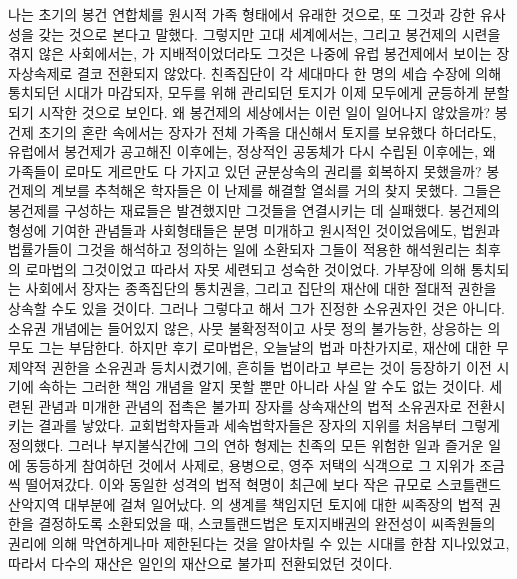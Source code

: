 나는 초기의 봉건 연합체를 원시적 가족 형태에서 유래한 것으로,
또
그것과 강한 유사성을 갖는 것으로 본다고 말했다.
그렇지만 고대 세계에서는,
그리고 봉건제의 시련을 겪지 않은 사회에서는,
가 지배적이었더라도 그것은 나중에 유럽 봉건제에서 보이는
장자상속제로 결코 전환되지 않았다.
친족집단이 각 세대마다 한 명의 세습 수장에 의해 통치되던 시대가 마감되자,
모두를 위해 관리되던 토지가 이제 모두에게 균등하게 분할되기
시작한 것으로 보인다.
왜 봉건제의 세상에서는 이런 일이 일어나지 않았을까?
봉건제 초기의 혼란 속에서는 장자가
전체 가족을 대신해서 토지를 보유했다 하더라도,
유럽에서 봉건제가 공고해진 이후에는,
정상적인 공동체가 다시 수립된 이후에는,
왜 가족들이
로마도 게르만도 다 가지고 있던 균분상속의 권리를
회복하지 못했을까?
봉건제의 계보를 추척해온 학자들은
이 난제를 해결할 열쇠를 거의 찾지 못했다.
그들은 봉건제를 구성하는 재료들은 발견했지만
그것들을 연결시키는 데 실패했다.
봉건제의 형성에 기여한 관념들과 사회형태들은
분명 미개하고 원시적인 것이었음에도,
법원과 법률가들이 그것을 해석하고 정의하는 일에 소환되자
그들이 적용한 해석원리는 최후의 로마법의 그것이었고
따라서 자못 세련되고 성숙한 것이었다.
가부장에 의해 통치되는 사회에서
장자는 종족집단의 통치권을,
그리고 집단의 재산에 대한 절대적 권한을 상속할 수도 있을 것이다.
그러나 그렇다고 해서 그가 진정한 소유권자인 것은 아니다.
소유권 개념에는 들어있지 않은,
사뭇 불확정적이고 사뭇 정의 불가능한,
상응하는 의무도 그는 부담한다.
하지만 후기 로마법은, 오늘날의 법과 마찬가지로,
재산에 대한 무제약적 권한을 소유권과 등치시켰기에,
흔히들 법이라고 부르는 것이 등장하기 이전 시기에 속하는
그러한 책임 개념을 알지 못할 뿐만 아니라 사실 알 수도 없는 것이다.
세련된 관념과 미개한 관념의 접촉은 불가피
장자를 상속재산의 법적 소유권자로 전환시키는 결과를 낳았다.
교회법학자들과 세속법학자들은 장자의 지위를 처음부터 그렇게 정의했다.
그러나 부지불식간에 그의 연하 형제는
친족의 모든 위험한 일과 즐거운 일에 동등하게 참여하던 것에서
사제로, 용병으로, 영주 저택의 식객으로 그 지위가 조금씩 떨어져갔다.
이와 동일한 성격의 법적 혁명이
최근에
보다 작은 규모로
스코틀랜드 산악지역 대부분에 걸쳐 일어났다.
의 생계를 책임지던 토지에 대한 씨족장의 법적 권한을
결정하도록 소환되었을 때, 스코틀랜드법은
토지지배권의 완전성이
씨족원들의 권리에 의해 막연하게나마 제한된다는 것을
알아차릴 수 있는 시대를 한참 지나있었고,
따라서 다수의 재산은 일인의 재산으로 불가피 전환되었던 것이다.


